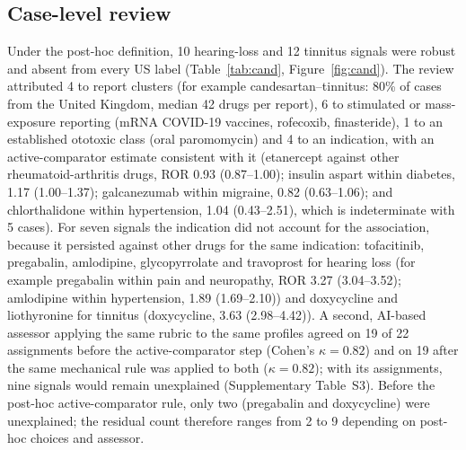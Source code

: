 \documentclass[11pt]{article}
\begin{document}
\subsection{Case-level review}
Under the post-hoc definition, 10 hearing-loss and 12 tinnitus signals were robust and absent from every US
label (Table~\ref{tab:cand}, Figure~\ref{fig:cand}). The review attributed 4 to report clusters (for
example candesartan--tinnitus: 80\%
of cases from the United Kingdom, median 42 drugs per
report), 6 to stimulated or mass-exposure reporting (mRNA COVID-19 vaccines, rofecoxib, finasteride),
1 to an established ototoxic class (oral paromomycin) and 4 to an indication, with an
active-comparator estimate consistent with it (etanercept against other rheumatoid-arthritis drugs,
ROR 0.93 (0.87--1.00); insulin aspart within diabetes, 1.17 (1.00--1.37); galcanezumab within migraine,
0.82 (0.63--1.06); and chlorthalidone within hypertension, 1.04 (0.43--2.51), which is indeterminate with
5 cases). For seven signals the
indication did not account for the association, because it persisted against other drugs for the same indication:
tofacitinib, pregabalin, amlodipine, glycopyrrolate and travoprost for hearing loss (for example pregabalin within pain and neuropathy, ROR 3.27 (3.04--3.52); amlodipine
within hypertension, 1.89 (1.69--2.10)) and doxycycline and liothyronine for tinnitus (doxycycline, 3.63 (2.98--4.42)).
A second, AI-based assessor applying the same rubric to the same profiles agreed on 19 of 22 assignments
before the active-comparator step (Cohen's $\kappa=0.82$) and on 19 after the same mechanical rule
was applied to both ($\kappa=0.82$); with its assignments, nine signals would remain unexplained
(Supplementary Table~S3). Before the post-hoc active-comparator rule, only two (pregabalin and doxycycline)
were unexplained; the residual count therefore ranges from 2 to 9 depending on post-hoc choices and assessor.
\end{document}
